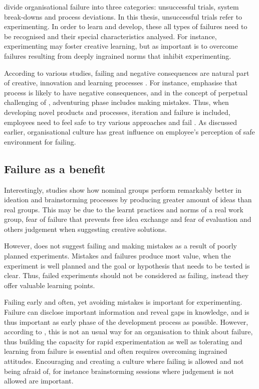 \citet{garvin2008yours} divide organisational failure into three categories: unsuccessful trials, system break-downs and process deviations. In this thesis, unsuccessful trials refer to experimenting. In order to learn and develop, these all types of failures need to be recognised and their special characteristics analysed. For instance, experimenting may foster creative learning, but as important is to overcome failures resulting from deeply ingrained norms that inhibit experimenting. \citep{garvin2008yours}

According to various studies, failing and negative consequences are natural part of creative, innovation and learning processes \citep{hennessey19881,shalley2004leaders,andriopoulos2000enhancing} . For instance, \citet{hennessey19881} emphasise that process is likely to have negative consequences, and in the concept of perpetual challenging of \citet{andriopoulos2000enhancing}, adventuring phase includes making mistakes. Thus, when developing novel products and processes, iteration and failure is included, employees need to feel safe to try various approaches and fail \citep{shalley2004leaders}. As discussed earlier, organisational culture has great influence on employee's perception of safe environment for failing.

\subsection{Failure as a benefit}
Interestingly, studies show how nominal groups perform remarkably better in ideation and brainstorming processes by producing greater amount of ideas than real groups. This may be due to the learnt practices and norms of a real work group, fear of failure that prevents free idea exchange and fear of evaluation and others judgement when suggesting creative solutions. \citep{jung2001transformational}

However, \citet{thomke2001enlightened} does not suggest failing and making mistakes as a result of poorly planned experiments. Mistakes and failures produce most value, when the experiment is well planned and the goal or hypothesis that needs to be tested is clear. Thus, failed experiments should not be considered as failing, instead they offer valuable learning points.

Failing early and often, yet avoiding mistakes is important for experimenting. Failure can disclose important information and reveal gaps in knowledge, and is thus important as early phase of the development process as possible. However, according to \citet{thomke2001enlightened}, this is not an usual way for an organisation to think about failure, thus building the capacity for rapid experimentation as well as tolerating and learning from failure is essential and often requires overcoming ingrained attitudes. Encouraging and creating a culture where failing is allowed and not being afraid of, for instance brainstorming sessions where judgement is not allowed are important. \citep{thomke2001enlightened}

